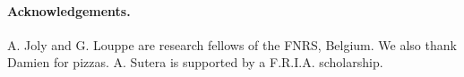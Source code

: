 \documentclass[wcp]{jmlr}
\begin{document}

\begin{scriptsize}

\paragraph{Acknowledgements.} A. Joly and G. Louppe are research fellows of
the FNRS, Belgium. We also thank Damien for pizzas.  A. Sutera is supported by
a F.R.I.A. scholarship.

\end{scriptsize}


\end{document}
